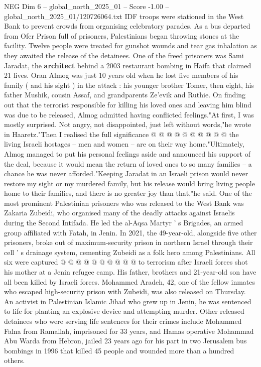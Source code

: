 \begin{textsample}{NEG Dim 6 – global\_north\_2025\_01 – Score -1.00 – global\_north\_2025\_01/120726064.txt}  \label{ex:f6_neg_104}
IDF troops were stationed in the West Bank to prevent crowds from organising celebratory parades.
As a bus departed from Ofer Prison full of prisoners, Palestinians began throwing stones at the facility.
Twelve people were treated for gunshot wounds and tear gas inhalation as they awaited the release of the detainees.
One of the freed prisoners was Sami Jaradat, the \textbf{architect} behind a 2003 restaurant bombing in Haifa that claimed 21 lives.
Oran Almog was just 10 years old when he lost five members of his family ( and his sight ) in the attack : his younger brother Tomer, then eight, his father Mushik, cousin Assaf, and grandparents Ze'evik and Ruthie.
On finding out that the terrorist responsible for killing his loved ones and leaving him blind was due to be released, Almog admitted having conflicted feelings."At first, I was mostly surprised.
Not angry, not disappointed, just left without words,"he wrote in Haaretz."Then I realised the full significance @ @ @ @ @ @ @ @ @ @ the living Israeli hostages -- men and women -- are on their way home."Ultimately, Almog managed to put his personal feelings aside and announced his support of the deal, because it would mean the return of loved ones to so many families -- a chance he was never afforded."Keeping Jaradat in an Israeli prison would never restore my sight or my murdered family, but his release would bring living people home to their families, and there is no greater joy than that,"he said.
One of the most prominent Palestinian prisoners who was released to the West Bank was Zakaria Zubeidi, who organised many of the deadly attacks against Israelis during the Second Intifada.
He led the al-Aqsa Martyr ' s Brigades, an armed group affiliated with Fatah, in Jenin.
In 2021, the 49-year-old, alongside five other prisoners, broke out of maximum-security prison in northern Israel through their cell ' s drainage system, cementing Zubeidi as a folk hero among Palestinians.
All six were captured @ @ @ @ @ @ @ @ @ @ to terrorism after Israeli forces shot his mother at a Jenin refugee camp.
His father, brothers and 21-year-old son have all been killed by Israeli forces.
Mohammed Aradeh, 42, one of the fellow inmates who escaped high-security prison with Zubeidi, was also released on Thursday.
An activist in Palestinian Islamic Jihad who grew up in Jenin, he was sentenced to life for planting an explosive device and attempting murder.
Other released detainees who were serving life sentences for their crimes include Mohammed Falna from Ramallah, imprisoned for 33 years, and Hamas operative Mohammad Abu Warda from Hebron, jailed 23 years ago for his part in two Jerusalem bus bombings in 1996 that killed 45 people and wounded more than a hundred others.

\end{textsample}
